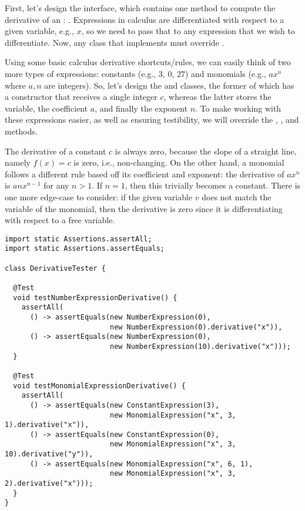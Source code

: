First, let's design the  interface, which contains one method to compute the derivative of an : . Expressions in calculus are differentiated with respect to a given variable, e.g., $x$, so we need to pass that to any expression that we wish to differentiate. Now, any class that implements  must override . 

Using some basic calculus derivative shortcuts/rules, we can easily think of two more types of expressions: constants (e.g., $3$, $0$, $27$) and monomials (e.g., $ax^n$ where $a, n$ are integers). So, let's design the  and  classes, the former of which has a constructor that receives a single integer $c$, whereas the latter stores the variable, the coefficient $a$, and finally the exponent $n$. To make working with these expressions easier, as well as ensuring testibility, we will override the , , and  methods.

The derivative of a constant $c$ is always zero, because the slope of a straight line, namely $f(x) = c$ is zero, i.e., non-changing. On the other hand, a monomial follows a different rule based off its coefficient and exponent: the derivative of $ax^n$ is $anx^{n-1}$ for any $n > 1$. If $n=1$, then this trivially becomes a constant. There is one more edge-case to consider: if the given variable $v$ does not match the variable of the monomial, then the derivative is zero since it is differentiating with respect to a free variable. 

\begin{lstlisting}[language=MyJava]
import static Assertions.assertAll;
import static Assertions.assertEquals;

class DerivativeTester {

  @Test
  void testNumberExpressionDerivative() {
    assertAll(
      () -> assertEquals(new NumberExpression(0),
                         new NumberExpression(0).derivative("x")),
      () -> assertEquals(new NumberExpression(0),
                         new NumberExpression(10).derivative("x")));
  }

  @Test
  void testMonomialExpressionDerivative() {
    assertAll(
      () -> assertEquals(new ConstantExpression(3),
                         new MonomialExpression("x", 3, 1).derivative("x")),
      () -> assertEquals(new ConstantExpression(0),
                         new MonomialExpression("x", 3, 10).derivative("y")),
      () -> assertEquals(new MonomialExpression("x", 6, 1),
                         new MonomialExpression("x", 3, 2).derivative("x")));
  }
}
\end{lstlisting}


